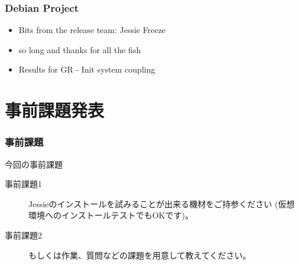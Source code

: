 \documentclass[cjk,dvipdfmx,10pt,compress,%
hyperref={bookmarks=true,bookmarksnumbered=true,bookmarksopen=false,%
colorlinks=false,%
pdftitle={第 91 回 関西 Debian 勉強会},%
pdfauthor={倉敷・のがた・佐々木・かわだ},%
pdfsubject={資料},%
}]{beamer}
\begin{document}
\begin{frame}[fragile]
  \frametitle{Debian Project}
  \begin{itemize}
  \item Bits from the release team: Jessie Freeze
  \item so long and thanks for all the fish
  \item Results for GR - Init system coupling
  \end{itemize}
\end{frame}


\section{事前課題発表}


\begin{frame}[fragile]
  \frametitle{事前課題}
  \begin{block}{今回の事前課題}
    \begin{description}
    \item[事前課題1]
      Jessieのインストールを試みることが出来る機材をご持参ください
      (仮想環境へのインストールテストでもOKです)。
    \item[事前課題2]
      もしくは作業、質問などの課題を用意して教えてください。
    \end{description}
  \end{block}
\end{frame}
\end{document}
